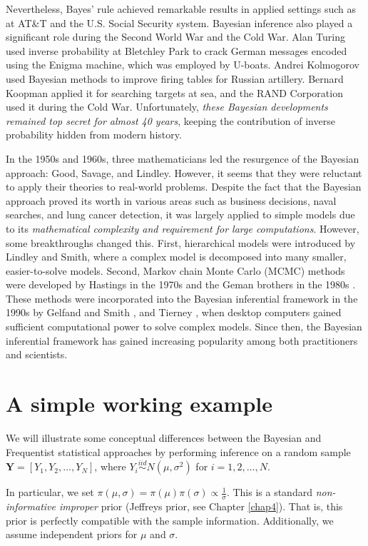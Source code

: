Nevertheless, Bayes' rule achieved remarkable results in applied settings such as at AT\&T and the U.S. Social Security system. Bayesian inference also played a significant role during the Second World War and the Cold War. Alan Turing used inverse probability at Bletchley Park to crack German messages encoded using the Enigma machine, which was employed by U-boats. Andrei Kolmogorov used Bayesian methods to improve firing tables for Russian artillery. Bernard Koopman applied it for searching targets at sea, and the RAND Corporation used it during the Cold War. Unfortunately, \textit{these Bayesian developments remained top secret for almost 40 years}, keeping the contribution of inverse probability hidden from modern history.

In the 1950s and 1960s, three mathematicians led the resurgence of the Bayesian approach: Good, Savage, and Lindley. However, it seems that they were reluctant to apply their theories to real-world problems. Despite the fact that the Bayesian approach proved its worth in various areas such as business decisions, naval searches, and lung cancer detection, it was largely applied to simple models due to its \textit{mathematical complexity and requirement for large computations}. However, some breakthroughs changed this. First, hierarchical models were introduced by Lindley and Smith, where a complex model is decomposed into many smaller, easier-to-solve models. Second, Markov chain Monte Carlo (MCMC) methods were developed by Hastings in the 1970s \cite{hastings70} and the Geman brothers in the 1980s \cite{Geman1984}. These methods were incorporated into the Bayesian inferential framework in the 1990s by Gelfand and Smith \cite{Gelfand1990}, and Tierney \cite{tierney1994markov}, when desktop computers gained sufficient computational power to solve complex models. Since then, the Bayesian inferential framework has gained increasing popularity among both practitioners and scientists.

\section{A simple working example}\label{sec26}

We will illustrate some conceptual differences between the Bayesian and Frequentist statistical approaches by performing inference on a random sample $\mathbf{Y} = [Y_1, Y_2, \dots, Y_N]$, where $Y_i \stackrel{iid}{\sim} N(\mu, \sigma^2)$ for $i = 1, 2, \dots, N$.

In particular, we set $\pi(\mu, \sigma) = \pi(\mu) \pi(\sigma) \propto \frac{1}{\sigma}$. This is a standard \textit{non-informative improper} prior (Jeffreys prior, see Chapter \ref{chap4}). That is, this prior is perfectly compatible with the sample information. Additionally, we assume independent priors for $\mu$ and $\sigma$.

